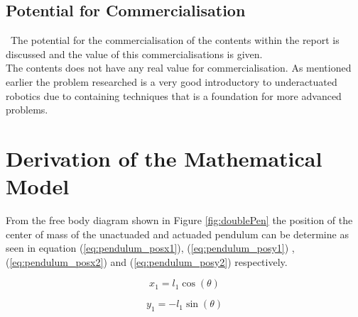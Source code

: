 \subsection{Potential for Commercialisation}\
The potential for the commercialisation of the contents within the report is discussed and the value of this commercialisations is given.\\

The contents does not have any real value for commercialisation. As mentioned earlier the problem researched is a very good introductory to underactuated robotics due to containing techniques that is a foundation for more advanced problems. 

\section{Derivation of the Mathematical Model}
\label{sec:math_model}

From the free body diagram shown in Figure \ref{fig:doublePen} the position of the center of mass of the unactuaded and actuaded pendulum can be determine as seen in equation (\ref{eq:pendulum_posx1}), (\ref{eq:pendulum_posy1}) , (\ref{eq:pendulum_posx2}) and (\ref{eq:pendulum_posy2}) respectively.

\begin{equation}
\label{eq:pendulum_posx1}
x_{1}= l_{1}\cos(\theta)
\end{equation}

\begin{equation}
\label{eq:pendulum_posy1}
y_{1} = -l_{1}\sin(\theta)
\end{equation}

